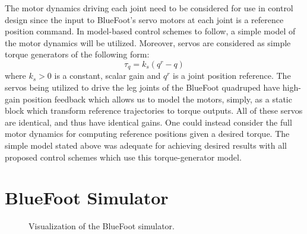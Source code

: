 			The motor dynamics driving each joint need to be considered for use in control design since the input to BlueFoot's servo motors at each joint is a reference position command. In model-based control schemes to follow, a simple model of the motor dynamics will be utilized. Moreover, servos are considered as simple torque generators of the following form:
				\begin{equation}
					\tau_{q} = k_{s}(q^{r}-q)
					\label{eq::servo_control_dynamics}
				\end{equation}
			where $k_{s}>0$ is a constant, scalar gain and $q^{r}$ is a joint position reference. The servos being utilized to drive the leg joints of the BlueFoot quadruped have high-gain position feedback which allows us to model the motors, simply, as a static block which transform reference trajectories to torque outputs. All of these servos are identical, and thus have identical gains. One could instead consider the full motor dynamics for computing reference positions given a desired torque. The simple model stated above was adequate for achieving desired results with all proposed control schemes which use this torque-generator model.


			


	\section{BlueFoot Simulator}

		\begin{figure}[h!]
			\centering
			\caption{Visualization of the BlueFoot simulator.}
			\label{fig::simulator_wide}
		\end{figure}


